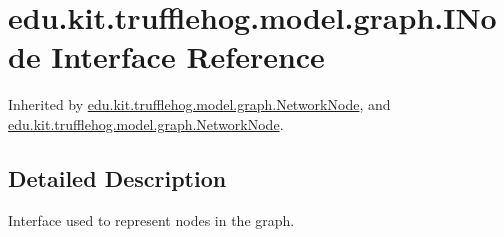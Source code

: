 \hypertarget{interfaceedu_1_1kit_1_1trufflehog_1_1model_1_1graph_1_1_i_node}{}\section{edu.\+kit.\+trufflehog.\+model.\+graph.\+I\+Node Interface Reference}
\label{interfaceedu_1_1kit_1_1trufflehog_1_1model_1_1graph_1_1_i_node}


Inherited by \hyperlink{classedu_1_1kit_1_1trufflehog_1_1model_1_1graph_1_1_network_node}{edu.\+kit.\+trufflehog.\+model.\+graph.\+Network\+Node}, and \hyperlink{classedu_1_1kit_1_1trufflehog_1_1model_1_1graph_1_1_network_node}{edu.\+kit.\+trufflehog.\+model.\+graph.\+Network\+Node}.



\subsection{Detailed Description}
Interface used to represent nodes in the graph. 